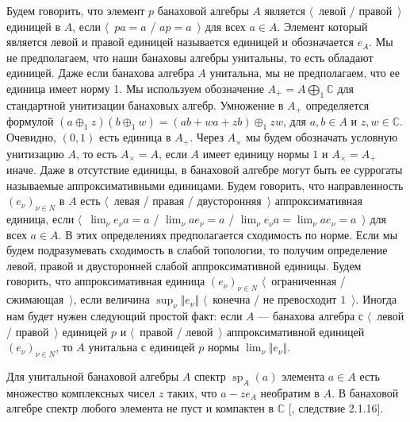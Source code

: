 Будем говорить, что элемент $p$ банаховой алгебры $A$ является $\langle$~левой / правой~$\rangle$  единицей в $A$, если $\langle$~$pa=a$ / $ap=a$~$\rangle$ для всех $a\in A$. Элемент который является левой и правой единицей называется единицей и обозначается $e_A$. Мы не предполагаем, что наши банаховы алгебры унитальны, то есть обладают единицей. Даже если банахова алгебра $A$ унитальна, мы не предполагаем, что ее единица имеет норму 1. Мы используем обозначение $A_+=A\bigoplus_1\mathbb{C}$ для стандартной унитизации банаховых алгебр. Умножение в $A_+$ определяется формулой $(a\oplus_1 z)(b\oplus_1 w)=(ab+wa+zb)\oplus_1 zw$, для $a,b\in A$ и $z,w\in\mathbb{C}$. Очевидно, $(0,1)$ есть единица в $A_+$. Через $A_\times$ мы будем обозначать условную унитизацию $A$, то есть $A_\times=A$, если $A$ имеет единицу нормы $1$ и $A_\times=A_+$ иначе. Даже в отсутствие единицы, в банаховой алгебре могут быть ее суррогаты называемые аппроксимативными единицами. Будем говорить, что направленность $(e_\nu)_{\nu\in N}$ в $A$ есть $\langle$~левая / правая / двусторонняя~$\rangle$ аппроксимативная единица, если $\langle$~$\lim_\nu e_\nu a=a$ / $\lim_\nu ae_\nu=a$ / $\lim_\nu e_\nu a=\lim_\nu ae_\nu=a$~$\rangle$ для всех $a\in A$. В этих определениях предполагается сходимость по норме. Если мы будем подразумевать сходимость в слабой топологии, то получим определение левой, правой и двусторонней слабой аппроксимативной единицы. Будем говорить, что аппроксимативная единица $(e_\nu)_{\nu\in N}$ $\langle$~ограниченная / сжимающая~$\rangle$, если величина $\sup_\nu\Vert e_\nu\Vert$ $\langle$~конечна / не превосходит $1$~$\rangle$. Иногда нам будет нужен следующий простой факт: если $A$ --- банахова алгебра с $\langle$~левой / правой~$\rangle$ единицей $p$ и $\langle$~правой / левой~$\rangle$ аппроксимативной единицей $(e_\nu)_{\nu\in N}$, то $A$ унитальна с единицей $p$ нормы $\lim_\nu\Vert e_\nu\Vert$. 

Для унитальной банаховой алгебры $A$ спектр $\operatorname{sp}_A(a)$ элемента $a\in A$ есть множество комплексных чисел $z$ таких, что $a-ze_A$ необратим в $A$. В банаховой алгебре спектр любого элемента не пуст и компактен в $\mathbb{C}$ [\cite{HelBanLocConvAlg}, следствие 2.1.16].

